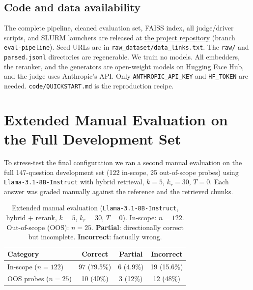 \documentclass[fleqn,moreauthors,10pt]{ds_report}
\begin{document}
\subsection*{Code and data availability}
The complete pipeline, cleaned evaluation set, FAISS index, all judge/driver scripts, and SLURM launchers are released at \href{https://github.com/UL-FRI-NLP-Course/ul-fri-nlp-course-project-2025-2026-neznaniletecipredmet}{the project repository} (branch \texttt{eval-pipeline}). Seed URLs are in \texttt{raw\_dataset/data\_links.txt}. The \texttt{raw/} and \texttt{parsed.jsonl} directories are regenerable. We train no models. All embedders, the reranker, and the generators are open-weight models on Hugging Face Hub, and the judge uses Anthropic's API. Only \texttt{ANTHROPIC\_API\_KEY} and \texttt{HF\_TOKEN} are needed. \texttt{code/QUICKSTART.md} is the reproduction recipe.








\appendix

\section{Extended Manual Evaluation on the Full Development Set}
\label{app:extended_eval}

To stress-test the final configuration we ran a second manual evaluation on the full 147-question development set (122 in-scope, 25 out-of-scope probes) using \texttt{Llama-3.1-8B-Instruct} with hybrid retrieval, $k{=}5$, $k_r{=}30$, $T{=}0$. Each answer was graded manually against the reference and the retrieved chunks.

\begin{table}[hbt]
	\caption{Extended manual evaluation (\texttt{Llama-3.1-8B-Instruct}, hybrid + rerank, $k{=}5$, $k_r{=}30$, $T{=}0$). In-scope: $n{=}122$. Out-of-scope (OOS): $n{=}25$. \textbf{Partial}: directionally correct but incomplete. \textbf{Incorrect}: factually wrong.}
	\centering
	\small
	\begin{tabular}{l|c|c|c}
		\toprule
		\textbf{Category} & \textbf{Correct} & \textbf{Partial} & \textbf{Incorrect} \\
		\midrule
		In-scope ($n{=}122$) & 97 (79.5\%) & 6 (4.9\%) & 19 (15.6\%) \\
		OOS probes ($n{=}25$) & 10 (40\%) & 3 (12\%) & 12 (48\%) \\
		\bottomrule
	\end{tabular}
	\label{tab:extended_eval}
\end{table}
\end{document}
